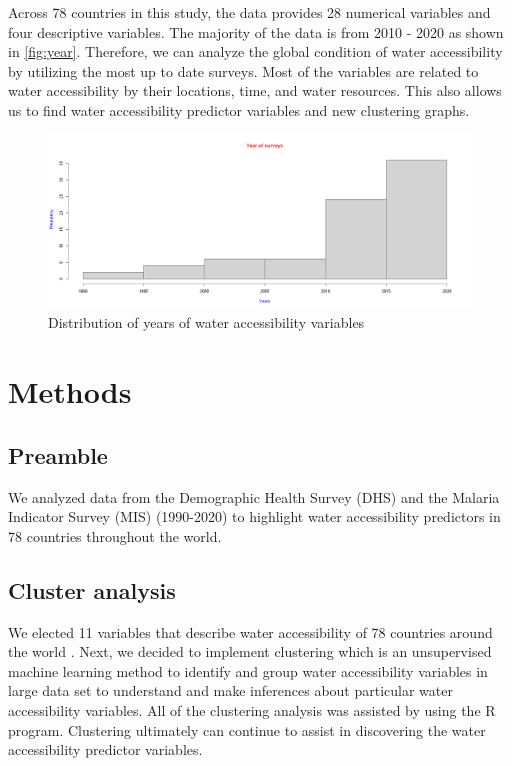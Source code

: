 \documentclass[10pt,twoside]{article}
\numberwithin{equation}{section}
\newcommand{\?}{\stackrel{?}{=}}
\begin{document}
Across 78 countries in this study, the data provides 28 numerical variables and four descriptive variables. The majority of the data is from 2010 - 2020 as shown in \autoref{fig:year}. Therefore, we can analyze the global condition of water accessibility by utilizing the most up to date surveys. Most of the variables are related to water accessibility by their locations, time, and water resources. This also allows us to find water accessibility predictor variables and new clustering graphs. 

\begin{figure}[h!]
  \centering
  \includegraphics[width=.7\textwidth]{year}
  \caption{Distribution of years of water accessibility variables}
  \label{fig:year}
\end{figure}


\section{Methods}

\subsection{Preamble}
We analyzed data from the Demographic Health Survey (DHS) and the Malaria Indicator Survey (MIS) (1990-2020) to highlight water accessibility predictors in 78 countries throughout the world.

\subsection{Cluster analysis}
We elected 11 variables that describe water accessibility of 78 countries around the world \citep{price2019difference}. Next, we decided to implement clustering which is an unsupervised machine learning method to identify and group water accessibility variables in large data set to understand and make inferences about particular water accessibility variables. All of the clustering analysis was assisted by using the R program. Clustering ultimately can continue to assist in discovering the water accessibility predictor variables. 
\end{document}
